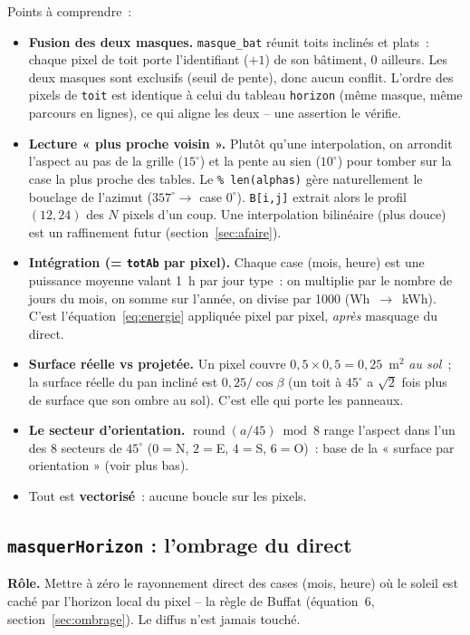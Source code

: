\documentclass[11pt,a4paper]{article}
\newcommand{\fonction}[1]{\texttt{#1}}
\begin{document}
Points à comprendre~:
\begin{itemize}
  \item \textbf{Fusion des deux masques.} \fonction{masque\_bat} réunit toits
    inclinés et plats~: chaque pixel de toit porte l'identifiant ($+1$) de son
    bâtiment, $0$ ailleurs. Les deux masques sont exclusifs (seuil de pente),
    donc aucun conflit. L'ordre des pixels de \fonction{toit} est identique à
    celui du tableau \fonction{horizon} (même masque, même parcours en lignes),
    ce qui aligne les deux -- une assertion le vérifie.
  \item \textbf{Lecture « plus proche voisin ».} Plutôt qu'une interpolation, on
    arrondit l'aspect au pas de la grille ($15^\circ$) et la pente au sien
    ($10^\circ$) pour tomber sur la case la plus proche des tables. Le
    \fonction{\% len(alphas)} gère naturellement le bouclage de l'azimut
    ($357^\circ \to$ case $0^\circ$). \fonction{B[i,j]} extrait alors le profil
    $(12,24)$ des $N$ pixels d'un coup. Une interpolation bilinéaire (plus douce)
    est un raffinement futur (section~\ref{sec:afaire}).
  \item \textbf{Intégration (= \fonction{totAb} par pixel).} Chaque case (mois,
    heure) est une puissance moyenne valant 1~h par jour type~: on multiplie par
    le nombre de jours du mois, on somme sur l'année, on divise par 1000
    (Wh~$\to$~kWh). C'est l'équation~\eqref{eq:energie} appliquée pixel par pixel,
    \emph{après} masquage du direct.
  \item \textbf{Surface réelle vs projetée.} Un pixel couvre $0{,}5\times0{,}5 =
    0{,}25$~m$^2$ \emph{au sol}~; la surface réelle du pan incliné est
    $0{,}25/\cos\beta$ (un toit à $45^\circ$ a $\sqrt2$ fois plus de surface que
    son ombre au sol). C'est elle qui porte les panneaux.
  \item \textbf{Le secteur d'orientation.} $\operatorname{round}(a/45)\bmod 8$
    range l'aspect dans l'un des 8 secteurs de $45^\circ$ ($0=$N, $2=$E, $4=$S,
    $6=$O)~: base de la « surface par orientation » (voir plus bas).
  \item Tout est \textbf{vectorisé}~: aucune boucle sur les pixels.
\end{itemize}

\subsection{\fonction{masquerHorizon} : l'ombrage du direct}

\textbf{Rôle.} Mettre à zéro le rayonnement direct des cases (mois, heure) où le
soleil est caché par l'horizon local du pixel -- la règle de Buffat
(équation~6, section~\ref{sec:ombrage}). Le diffus n'est jamais touché.
\end{document}
